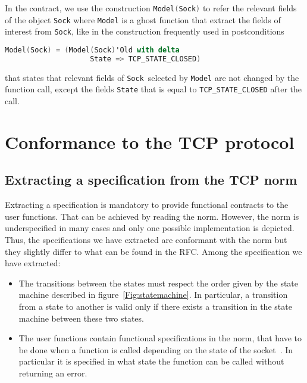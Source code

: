 \documentclass[conference]{IEEEtran}
\def\spark#1{\lstinline[language=Ada]{#1}}
\begin{document}
In the contract, we use the construction \spark{Model(Sock)} to refer the
relevant fields of the object \spark{Sock} where
\spark{Model} is a ghost function that extract the fields of interest from
\spark{Sock}, like in the construction frequently used in postconditions
\begin{lstlisting}[language=Ada, basicstyle=\small\ttfamily]
Model(Sock) = (Model(Sock)'Old with delta
                    State => TCP_STATE_CLOSED)
\end{lstlisting}
that states that relevant fields of \spark{Sock} selected by \spark{Model} are
not changed by the function call, except the fields \spark{State} that is equal
to \spark{TCP_STATE_CLOSED} after the call.

\section{Conformance to the TCP protocol}
\label{sec:verif}



\subsection{Extracting a specification from the TCP norm}

Extracting a specification
is mandatory to provide functional contracts to the user functions. That can
be achieved by reading the norm. However, the norm is underspecified in many
cases and only one possible implementation is depicted. Thus, the specifications
we have extracted are conformant with the norm but they slightly differ to what
can be found in the RFC.
Among the specification we have extracted:
\begin{itemize}
\item The transitions between the states must respect the order given by the
state machine described in figure~\ref{Fig:statemachine}.
In particular, a transition from a state to
another is valid only if there exists a transition in the state machine between
these two states.
\item The user functions contain functional specifications in the norm, that
have to be done  when a function is called depending on the state of the
socket~\cite[p. 52]{rfc793}. In particular it is specified in what state the
function can be called without returning an error.
\end{itemize}
\end{document}
